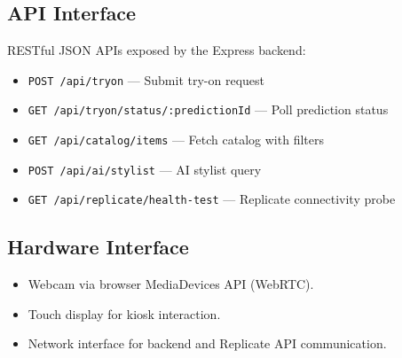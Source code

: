 \subsection{API Interface}

RESTful JSON APIs exposed by the Express backend:

\begin{itemize}[leftmargin=*]
  \item \texttt{POST /api/tryon} --- Submit try-on request
  \item \texttt{GET /api/tryon/status/:predictionId} --- Poll prediction status
  \item \texttt{GET /api/catalog/items} --- Fetch catalog with filters
  \item \texttt{POST /api/ai/stylist} --- AI stylist query
  \item \texttt{GET /api/replicate/health-test} --- Replicate connectivity probe
\end{itemize}

\subsection{Hardware Interface}

\begin{itemize}[leftmargin=*]
  \item Webcam via browser MediaDevices API (WebRTC).
  \item Touch display for kiosk interaction.
  \item Network interface for backend and Replicate API communication.
\end{itemize}
